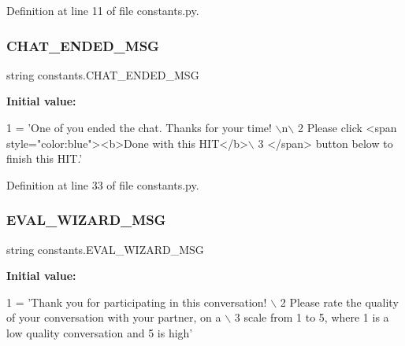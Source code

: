 Definition at line 11 of file constants.\+py.

\mbox{\label{namespaceconstants_acc9fee360f420b9cba2c54a8314f8b16}} 
\subsubsection{\texorpdfstring{C\+H\+A\+T\+\_\+\+E\+N\+D\+E\+D\+\_\+\+M\+SG}{CHAT\_ENDED\_MSG}}
{\footnotesize\ttfamily string constants.\+C\+H\+A\+T\+\_\+\+E\+N\+D\+E\+D\+\_\+\+M\+SG}

{\bfseries Initial value\+:}
\begin{DoxyCode}
1 =  \textcolor{stringliteral}{'One of you ended the chat. Thanks for your time! \(\backslash\)n\(\backslash\)}
2 \textcolor{stringliteral}{        Please click <span style="color:blue"><b>Done with this HIT</b>\(\backslash\)}
3 \textcolor{stringliteral}{        </span> button below to finish this HIT.'}
\end{DoxyCode}


Definition at line 33 of file constants.\+py.

\mbox{\label{namespaceconstants_a4352b762075995e38d4c552cc55c0c1b}} 
\subsubsection{\texorpdfstring{E\+V\+A\+L\+\_\+\+W\+I\+Z\+A\+R\+D\+\_\+\+M\+SG}{EVAL\_WIZARD\_MSG}}
{\footnotesize\ttfamily string constants.\+E\+V\+A\+L\+\_\+\+W\+I\+Z\+A\+R\+D\+\_\+\+M\+SG}

{\bfseries Initial value\+:}
\begin{DoxyCode}
1 =  \textcolor{stringliteral}{'Thank you for participating in this conversation! \(\backslash\)}
2 \textcolor{stringliteral}{        Please rate the quality of your conversation with your partner, on a \(\backslash\)}
3 \textcolor{stringliteral}{        scale from 1 to 5, where 1 is a low quality conversation and 5 is high'}
\end{DoxyCode}



